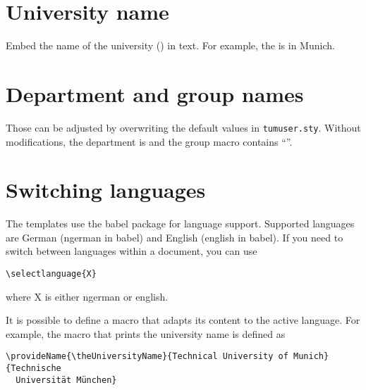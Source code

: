\tableofcontents

\section{University name}

Embed the name of the university (\theUniversityName{}) in text. For example,
the \theUniversityName{} is in Munich.

\section{Department and group names}

Those can be adjusted by overwriting the default values in
\texttt{tumuser.sty}. Without modifications, the department is
\theDepartmentName{} and the group macro contains ``\theChairName{}''.

\section{Switching languages}

The templates use the babel package for language support. Supported languages
are German (ngerman in babel) and English (english in babel). If you need to
switch between languages within a document, you can use
\begin{verbatim}
\selectlanguage{X}
\end{verbatim}
where X is either ngerman or english.

It is possible to define a macro that adapts its content to the active
language. For example, the macro that prints the university name is defined
as
\begin{verbatim}
\provideName{\theUniversityName}{Technical University of Munich}{Technische
  Universität München}
\end{verbatim}
